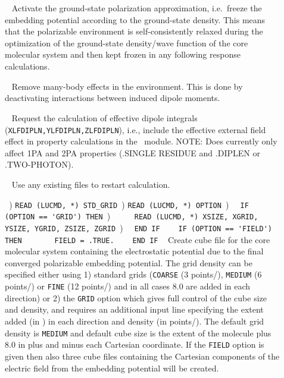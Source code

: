 \begin{description}
\item[]\verb| |\newline
Activate the ground-state polarization approximation, i.e.\ freeze the embedding potential according to the ground-state density. This means that the polarizable environment is self-consistently relaxed during the optimization of the ground-state density/wave function of the core molecular system and then kept frozen in any following response calculations.

\item[]\verb| |\newline
Remove many-body effects in the environment. This is done by deactivating interactions between induced dipole moments.

\item[]\verb| |\newline
Request the calculation of effective dipole integrals (\verb|XLFDIPLN,YLFDIPLN,ZLFDIPLN|), i.e.,
include the effective external field effect in property calculations in the \resp\ module.
NOTE: Does currently only affect 1PA and 2PA properties (.SINGLE RESIDUE and .DIPLEN or .TWO-PHOTON).

\item[]\verb| |\newline
Use any existing files to restart calculation.

\item[]\verb| |) \verb|READ (LUCMD, *) STD_GRID|\verb| |) \verb|READ (LUCMD, *) OPTION|\verb| |) \verb|  IF (OPTION == 'GRID') THEN|\verb| |) \verb|     READ (LUCMD, *) XSIZE, XGRID, YSIZE, YGRID, ZSIZE, ZGRID|\verb| |) \verb|  END IF| \verb| |\newline
\verb|  IF (OPTION == 'FIELD') THEN|\verb| |\newline
\verb|      FIELD = .TRUE.| \verb| |\newline
\verb|  END IF| \verb| |\newline
Create cube file for the core molecular system containing the
electrostatic potential due to the final converged polarizable
embedding potential. The grid density can be specified either
using 1) standard grids (\verb|COARSE| (3 points/\bohr{}), \verb|MEDIUM| (6 points/\bohr{})
or \verb|FINE| (12 points/\bohr{}) and in all cases 8.0 \bohr{} are added in each direction) or 2) the \verb|GRID|
option which gives full control of the cube size and density, and
requires an additional input line specifying the extent added (in \bohr{}) in each direction and
density (in points/\bohr{}). The default grid density is \verb|MEDIUM| and default cube size
is the extent of the molecule plus 8.0 \bohr{} in plus and minus each
Cartesian coordinate.
If the \verb|FIELD| option is given then also three cube files
containing the Cartesian components of the electric field from the
embedding potential will be created.


\end{description}
